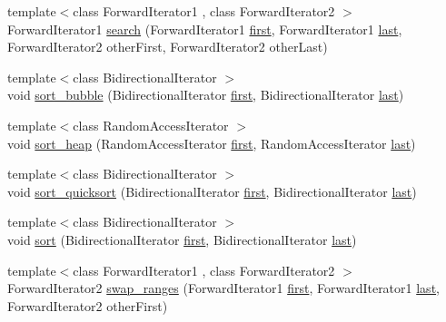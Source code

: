 \begin{DoxyCompactItemize}
\item 
{\footnotesize template$<$class Forward\+Iterator1 , class Forward\+Iterator2 $>$ }\\Forward\+Iterator1 \hyperlink{namespaceprism_a03dbb806369b062fd90909fd826c2ee4}{search} (Forward\+Iterator1 \hyperlink{namespaceprism_ae3fb7a1926a9e8e59300cd5e370470da}{first}, Forward\+Iterator1 \hyperlink{namespaceprism_abe4956c4e865f55ca126b7fb973b5078}{last}, Forward\+Iterator2 other\+First, Forward\+Iterator2 other\+Last)
\item 
{\footnotesize template$<$class Bidirectional\+Iterator $>$ }\\void \hyperlink{namespaceprism_aa2955433bd872919cf59580c1a464c93}{sort\+\_\+bubble} (Bidirectional\+Iterator \hyperlink{namespaceprism_ae3fb7a1926a9e8e59300cd5e370470da}{first}, Bidirectional\+Iterator \hyperlink{namespaceprism_abe4956c4e865f55ca126b7fb973b5078}{last})
\item 
{\footnotesize template$<$class Random\+Access\+Iterator $>$ }\\void \hyperlink{namespaceprism_a1e9fe74c5dcee70bf5dd5c89f1234a02}{sort\+\_\+heap} (Random\+Access\+Iterator \hyperlink{namespaceprism_ae3fb7a1926a9e8e59300cd5e370470da}{first}, Random\+Access\+Iterator \hyperlink{namespaceprism_abe4956c4e865f55ca126b7fb973b5078}{last})
\item 
{\footnotesize template$<$class Bidirectional\+Iterator $>$ }\\void \hyperlink{namespaceprism_ad8cbe49b782032932d0da83860e7b368}{sort\+\_\+quicksort} (Bidirectional\+Iterator \hyperlink{namespaceprism_ae3fb7a1926a9e8e59300cd5e370470da}{first}, Bidirectional\+Iterator \hyperlink{namespaceprism_abe4956c4e865f55ca126b7fb973b5078}{last})
\item 
{\footnotesize template$<$class Bidirectional\+Iterator $>$ }\\void \hyperlink{namespaceprism_addfe9ea0146b59b2b16adee4cd2220b9}{sort} (Bidirectional\+Iterator \hyperlink{namespaceprism_ae3fb7a1926a9e8e59300cd5e370470da}{first}, Bidirectional\+Iterator \hyperlink{namespaceprism_abe4956c4e865f55ca126b7fb973b5078}{last})
\item 
{\footnotesize template$<$class Forward\+Iterator1 , class Forward\+Iterator2 $>$ }\\Forward\+Iterator2 \hyperlink{namespaceprism_a4661f2c0c4dca098c137179b4d93f3dc}{swap\+\_\+ranges} (Forward\+Iterator1 \hyperlink{namespaceprism_ae3fb7a1926a9e8e59300cd5e370470da}{first}, Forward\+Iterator1 \hyperlink{namespaceprism_abe4956c4e865f55ca126b7fb973b5078}{last}, Forward\+Iterator2 other\+First)

\end{DoxyCompactItemize}
